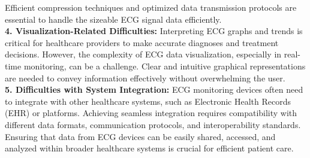 Efficient compression techniques and optimized data transmission protocols are essential to handle the sizeable ECG signal data efficiently.
\\
\textbf{4. Visualization-Related Difficulties:}
Interpreting ECG graphs and trends is critical for healthcare providers to make accurate diagnoses and treatment decisions.
However, the complexity of ECG data visualization, especially in real-time monitoring, can be a challenge.
Clear and intuitive graphical representations are needed to convey information effectively without overwhelming the user.
\\
\textbf{5. Difficulties with System Integration:}
ECG monitoring devices often need to integrate with other healthcare systems, such as Electronic Health Records (EHR) or platforms.
Achieving seamless integration requires compatibility with different data formats, communication protocols, and interoperability standards.
Ensuring that data from ECG devices can be easily shared, accessed, and analyzed within broader healthcare systems is crucial for efficient patient care.
